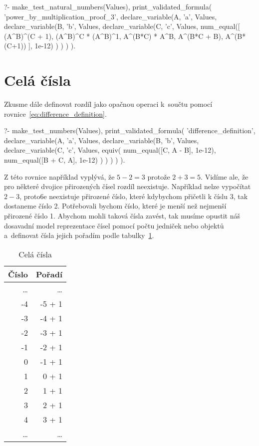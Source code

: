 \begin{prolog}
?-	make_test_natural_numbers(Values),
	print_validated_formula(
		'power_by_multiplication_proof_3',
		declare_variable(A, 'a', Values,
			declare_variable(B, 'b', Values,
				declare_variable(C, 'c', Values,
					num_equal([
						(A^B)^(C + 1),
						(A^B)^C * (A^B)^1,
						A^(B*C) * A^B,
						A^(B*C + B),
						A^(B*(C+1))
					], 1e-12)
				)
			)
		)
	).
\end{prolog}

\section{Celá čísla}

Zkusme dále definovat rozdíl jako opačnou operaci k~součtu pomocí rovnice~\eqref{eq:difference_definition}.

\begin{prolog}
?-	make_test_numbers(Values),
	print_validated_formula(
		'difference_definition',
		declare_variable(A, 'a', Values,
			declare_variable(B, 'b', Values,
				declare_variable(C, 'c', Values,
					equiv(
						num_equal([C, A - B], 1e-12),
						num_equal([B + C, A], 1e-12)
					)
				)
			)
		)
	).
\end{prolog}

Z této rovnice například vyplývá, že \(5 - 2 = 3\) protože \(2 + 3 = 5\). Vidíme ale, že pro některé dvojice přirozených čísel rozdíl neexistuje. Například nelze vypočítat \(2 - 3\), proto6e neexistuje přirozené číslo, které kdybychom přičetli k číslu 3, tak dostaneme číslo 2. Potřebovali bychom číslo, které je menší než nejmenší přirozené číslo 1. Abychom mohli taková čísla zavést, tak musíme opustit náš dosavadní model reprezentace čísel pomocí počtu jedniček nebo objektů a~definovat čísla jejich pořadím podle tabulky~\ref{tab:integers}.


\begin{table}[ht]
\centering
\begin{tabular}{|r|r|}
\hline
Číslo & Pořadí \\
\hline
\ldots & \ldots \\
-4 & -5 + 1 \\
-3 & -4 + 1 \\
-2 & -3 + 1 \\
-1 & -2 + 1 \\
0 & -1 + 1 \\
1 & 0 + 1 \\
2 & 1 + 1 \\
3 & 2 + 1 \\
4 & 3 + 1 \\
\ldots & \ldots \\
\hline
\end{tabular}
\caption{Celá čísla}
\label{tab:integers}
\end{table}


